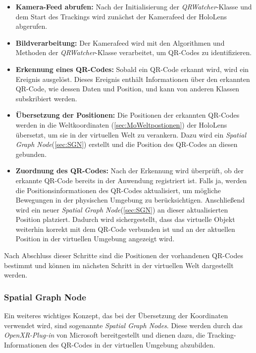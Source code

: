 \begin{itemize}
    \item \textbf{Kamera-Feed abrufen:} Nach der Initialisierung der \textit{QRWatcher}-Klasse und dem Start des Trackings wird zunächst der Kamerafeed der HoloLens abgerufen.
    \item \textbf{Bildverarbeitung:} Der Kamerafeed wird mit den Algorithmen und Methoden der \textit{QRWatcher}-Klasse verarbeitet, um QR-Codes zu identifizieren.
    \item \textbf{Erkennung eines QR-Codes:} Sobald ein QR-Code erkannt wird, wird ein Ereignis ausgelöst. Dieses Ereignis enthält Informationen über den erkannten QR-Code, wie dessen Daten und Position, und kann von anderen Klassen subskribiert werden.
    \item \textbf{Übersetzung der Positionen:} Die Positionen der erkannten QR-Codes werden in die Weltkoordinaten (\ref{sec:MoWeltpostionen}) der HoloLens übersetzt, um sie in der virtuellen Welt zu verankern. Dazu wird ein \textit{Spatial Graph Node}(\ref{sec:SGN}) erstellt und die Position des QR-Codes an diesen gebunden.
    \item \textbf{Zuordnung des QR-Codes:} Nach der Erkennung wird überprüft, ob der erkannte QR-Code bereits in der Anwendung registriert ist. Falls ja, werden die Positionsinformationen des QR-Codes aktualisiert, um mögliche Bewegungen in der physischen Umgebung zu berücksichtigen. Anschließend wird ein neuer \textit{Spatial Graph Node}(\ref{sec:SGN}) an dieser aktualisierten Position platziert. Dadurch wird sichergestellt, dass das virtuelle Objekt weiterhin korrekt mit dem QR-Code verbunden ist und an der aktuellen Position in der virtuellen Umgebung angezeigt wird.
\end{itemize}

Nach Abschluss dieser Schritte sind die Positionen der vorhandenen QR-Codes bestimmt und können im nächsten Schritt in der virtuellen Welt dargestellt werden.

\subsubsection{\label{sec:SGN}Spatial Graph Node}
Ein weiteres wichtiges Konzept, das bei der Übersetzung der Koordinaten verwendet wird, sind sogenannte \textit{Spatial Graph Nodes}. Diese werden durch das \textit{OpenXR-Plug-in} von Microsoft bereitgestellt und dienen dazu, die Tracking-Informationen des QR-Codes in der virtuellen Umgebung abzubilden.

